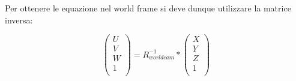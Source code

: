 Per ottenere le equazione nel world frame si deve dunque utilizzare la matrice inversa:

$$
\begin{pmatrix}
U  \\
V  \\
W  \\
1  \\
\end{pmatrix}
=R_{worldcam}^{-1}*
\begin{pmatrix}
X  \\
Y  \\
Z  \\
1  \\
\end{pmatrix}
$$
